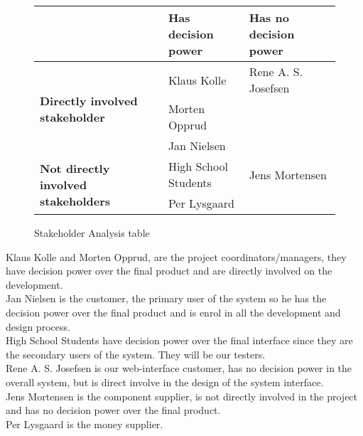 \begin{figure}[h!]
 \begin{center}
  \begin{tabular}{| l | l | l |}
   \hline
    & \textbf{Has decision power} & \textbf{Has no decision power} \\ \hline
    \multirow{3}{*}{\textbf{Directly involved stakeholder}} 
    	& Klaus Kolle & Rene A. S. Josefsen\\ 
    	& Morten Opprud &  \\ 
    	& Jan Nielsen &  \\ \hline
    \multirow{2}{*}{\textbf{Not directly involved stakeholders}} 
    	& High School Students & Jens Mortensen\\
    	& Per Lysgaard & \\ \hline
   \end{tabular}
  \end{center}
 \caption{Stakeholder Analysis table}
\end{figure}

Klaus Kolle and Morten Opprud, are the project coordinators/managers, they
have decision power over the final product and are directly involved on the
development.\\

Jan Nielsen is the customer, the primary user of the system so he has the
decision power over the final product and is enrol in all the development and design process.\\

High School Students have decision power over the final interface since they
are the secondary users of the system. They will be our testers.\\

Rene A. S. Josefsen is our web-interface customer, has no decision power in the
overall system, but is direct involve in the design of the system interface.\\

Jens Mortensen is the component supplier, is not directly involved in the
project and has no decision power over the final product.\\

Per Lysgaard is the money supplier.\\
